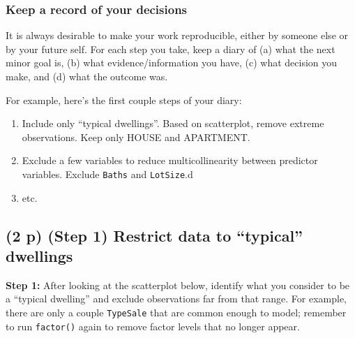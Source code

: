 \documentclass[
  12pt,
]{article}
\providecommand{\tightlist}{%
  \setlength{\itemsep}{0pt}\setlength{\parskip}{0pt}}
\begin{document}
\hypertarget{keep-a-record-of-your-decisions}{%
\subsubsection{Keep a record of your
decisions}\label{keep-a-record-of-your-decisions}}

It is always desirable to make your work reproducible, either by someone
else or by your future self. For each step you take, keep a diary of (a)
what the next minor goal is, (b) what evidence/information you have, (c)
what decision you make, and (d) what the outcome was.

For example, here's the first couple steps of your diary:

\begin{enumerate}
\def\labelenumi{\arabic{enumi}.}
\tightlist
\item
  Include only ``typical dwellings''. Based on scatterplot, remove
  extreme observations. Keep only HOUSE and APARTMENT.
\item
  Exclude a few variables to reduce multicollinearity between predictor
  variables. Exclude \texttt{Baths} and \texttt{LotSize}.d
\item
  etc.
\end{enumerate}

\hypertarget{p-step-1-restrict-data-to-typical-dwellings}{%
\subsection{\texorpdfstring{\textbf{(2 p)} (Step 1) Restrict data to
``typical''
dwellings}{(2 p) (Step 1) Restrict data to ``typical'' dwellings}}\label{p-step-1-restrict-data-to-typical-dwellings}}

\textbf{Step 1:} After looking at the scatterplot below, identify what
you consider to be a ``typical dwelling'' and exclude observations far
from that range. For example, there are only a couple \texttt{TypeSale}
that are common enough to model; remember to run \texttt{factor()} again
to remove factor levels that no longer appear.
\end{document}
